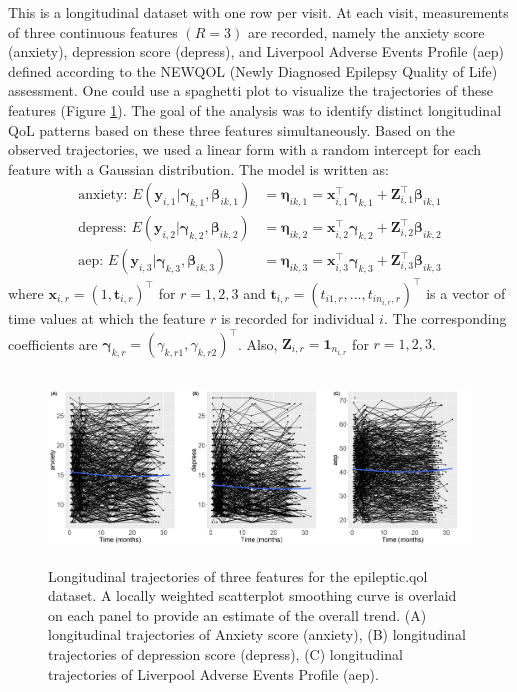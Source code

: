 This is a longitudinal dataset with one row per visit. At each visit, measurements of three continuous features $(R = 3)$ are recorded, namely the anxiety score (anxiety), depression score (depress), and Liverpool Adverse Events Profile (aep) defined according to the NEWQOL (Newly Diagnosed Epilepsy Quality of Life) assessment. One could use a spaghetti plot to visualize the trajectories of these features (Figure \ref{fig:traj_demo}). The goal of the analysis was to identify distinct longitudinal QoL patterns based on these three features simultaneously. Based on the observed trajectories, we used a linear form with a random intercept for each feature with a Gaussian distribution. The model is written as: 
\begin{align*}
  \text{anxiety: }  E(\boldsymbol{y}_{i,1}|\boldsymbol{\gamma}_{k,1}, \boldsymbol{\beta}_{ik,1}) & = \boldsymbol{\eta}_{ik,1}  =   \boldsymbol{x}_{i,1}^\top\boldsymbol{\gamma}_{k,1} +  \boldsymbol{Z}_{i,1}^\top\boldsymbol{\beta}_{ik,1}  \\
  \text{depress: }    E(\boldsymbol{y}_{i,2}|\boldsymbol{\gamma}_{k,2}, \boldsymbol{\beta}_{ik,2}) & = \boldsymbol{\eta}_{ik,2}  =  \boldsymbol{x}_{i,2}^\top\boldsymbol{\gamma}_{k,2} +  \boldsymbol{Z}_{i,2}^\top\boldsymbol{\beta}_{ik,2} \\
  \text{aep: }   E(\boldsymbol{y}_{i,3}|\boldsymbol{\gamma}_{k,3},\boldsymbol{\beta}_{ik,3}) & =  \boldsymbol{\eta}_{ik,3} = \boldsymbol{x}_{i,3}^\top\boldsymbol{\gamma}_{k,3} +  \boldsymbol{Z}_{i,3}^\top\boldsymbol{\beta}_{ik,3}
\end{align*}
where $ \boldsymbol{x}_{i,r} = (1,  \boldsymbol{t}_{i,r})^\top$ for $r=1,2,3$ and $\boldsymbol{t}_{i,r} = (t_{i1,r},...,t_{in_{i,r},r})^\top$ is a vector of time values at which the feature $r$ is recorded for individual $i$. The corresponding coefficients are $\boldsymbol{\gamma}_{k,r} =  (\gamma_{k,r1}, \gamma_{k,r2})^\top$. Also, $\boldsymbol{Z}_{i,r} =\boldsymbol{1}_{n_{i,r}}$ for $r=1,2,3$.

\begin{figure}[h]
\centering
\includegraphics[width=\textwidth,height=5cm]{./Figures/traj.JPEG}
\caption{\label{fig:traj_demo} Longitudinal trajectories of three features for the epileptic.qol dataset. A locally weighted scatterplot smoothing curve is overlaid on each panel to provide an estimate of the overall trend. (A) longitudinal trajectories of Anxiety score (anxiety), (B) longitudinal trajectories of depression score (depress), (C) longitudinal trajectories of Liverpool Adverse Events Profile (aep).}
\end{figure}

